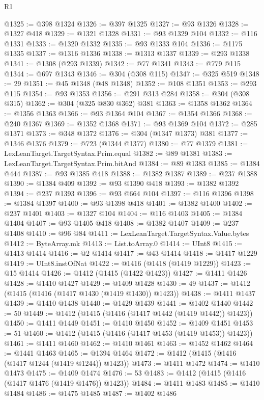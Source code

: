 \begin{lexlean}{R1}
\begin{coremodule}
@1325 := @398 @1324
@1326 := @397 @1325
@1327 := @93 @1326
@1328 := @1327 @418
@1329 := @1321 @1328
@1331 := @93 @1329 @104
@1332 := @116 @1331
@1333 := @1320 @1332
@1335 := @93 @1333 @104
@1336 := @1175 @1335
@1337 := @1316 @1336
@1338 := @1313 @1337
@1339 := @293 @1338
@1341 := @1308 (@293 @1339)
@1342 := @77 @1341
@1343 := @779 @115
@1344 := @697 @1343
@1346 := @304 (@308 @115)
@1347 := @325 @519
@1348 := 29
@1351 := @45 @1348 (@48 @1348)
@1352 := @108 @1351
@1353 := @293 @115
@1354 := @93 @1353
@1356 := @291 @313 @284
@1358 := @304 (@308 @315)
@1362 := @304 (@325 @830 @362) @381
@1363 := @1358 @1362
@1364 := @1356 @1363
@1366 := @93 @1364 @104
@1367 := @1354 @1366
@1368 := @240 @1367
@1369 := @1352 @1368
@1371 := @93 @1369 @104
@1372 := @285 @1371
@1373 := @348 @1372
@1376 := @304 (@1347 @1373) @381
@1377 := @1346 @1376
@1379 := @723 (@1344 @1377)
@1380 := @77 @1379
@1381 := LexLeanTarget.TargetSyntax.Prim.equal
@1382 := @89 @1381
@1383 := LexLeanTarget.TargetSyntax.Prim.bitAnd
@1384 := @89 @1383
@1385 := @1384 @444
@1387 := @93 @1385 @418
@1388 := @1382 @1387
@1389 := @237 @1388
@1390 := @1384 @409
@1392 := @93 @1390 @418
@1393 := @1382 @1392
@1394 := @237 @1393
@1396 := @93 @664 @104
@1397 := @116 @1396
@1398 := @1384 @1397
@1400 := @93 @1398 @418
@1401 := @1382 @1400
@1402 := @237 @1401
@1403 := @1327 @104
@1404 := @116 @1403
@1405 := @1384 @1404
@1407 := @93 @1405 @418
@1408 := @1382 @1407
@1409 := @237 @1408
@1410 := @96 @84
@1411 := LexLeanTarget.TargetSyntax.Value.bytes
@1412 := ByteArray.mk
@1413 := List.toArray.{0}
@1414 := UInt8
@1415 := @1413 @1414
@1416 := @2 @1414
@1417 := @43 @1414
@1418 := @1417 @1229
@1419 := UInt8.instOfNat
@1422 := @1416 (@1418 (@1419 @1229))
@1423 := @15 @1414
@1426 := @1412 (@1415 (@1422 @1423))
@1427 := @1411 @1426
@1428 := @1410 @1427
@1429 := @1409 @1428
@1430 := 49
@1437 := @1412 (@1415 (@1416 (@1417 @1430 (@1419 @1430)) @1423))
@1438 := @1411 @1437
@1439 := @1410 @1438
@1440 := @1429 @1439
@1441 := @1402 @1440
@1442 := 50
@1449 := @1412 (@1415 (@1416 (@1417 @1442 (@1419 @1442)) @1423))
@1450 := @1411 @1449
@1451 := @1410 @1450
@1452 := @1409 @1451
@1453 := 51
@1460 := @1412 (@1415 (@1416 (@1417 @1453 (@1419 @1453)) @1423))
@1461 := @1411 @1460
@1462 := @1410 @1461
@1463 := @1452 @1462
@1464 := @1441 @1463
@1465 := @1394 @1464
@1472 := @1412 (@1415 (@1416 (@1417 @1244 (@1419 @1244)) @1423))
@1473 := @1411 @1472
@1474 := @1410 @1473
@1475 := @1409 @1474
@1476 := 53
@1483 := @1412 (@1415 (@1416 (@1417 @1476 (@1419 @1476)) @1423))
@1484 := @1411 @1483
@1485 := @1410 @1484
@1486 := @1475 @1485
@1487 := @1402 @1486

\end{coremodule}
\end{lexlean}
